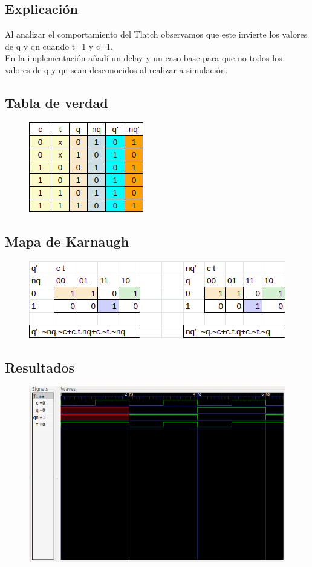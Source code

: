 \subsection*{Explicación}
Al analizar el comportamiento del Tlatch observamos que este invierte los valores de q y qn cuando t=1 y c=1.\\
En la implementación añadí un delay y un caso base para que no todos los valores de q y qn sean desconocidos al realizar a simulación. 

\subsection*{Tabla de verdad}
\begin{figure}[h]
    \centering
    \includegraphics{fotos/TruthTable/arki-lab2-TT_tlatch.png}
\end{figure}

\subsection*{Mapa de Karnaugh}
\begin{figure}[h]
    \centering
    \includegraphics[scale=0.8]{fotos/kmaps/arki-lab2-kmap_tlatch.png}
\end{figure}

\newpage
\subsection*{Resultados}
\begin{figure}[htbp]
    \centering
    \includegraphics[scale=0.5]{fotos/resultados/arki-lab2-R_tlatch.png}
\end{figure}
